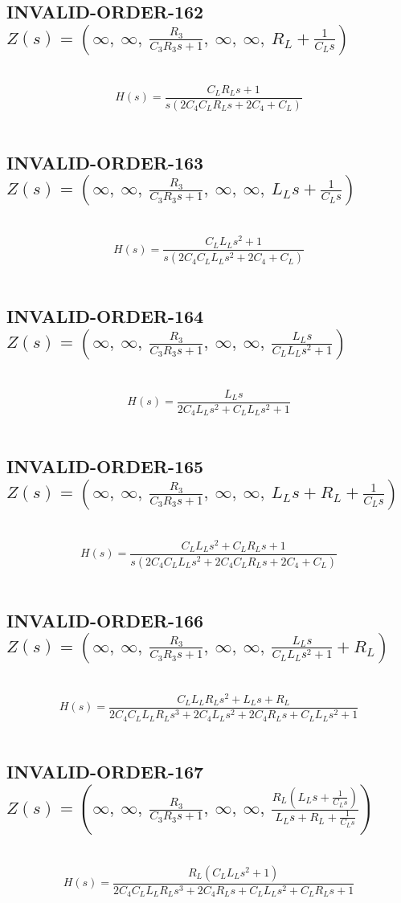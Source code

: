 \documentclass{article}
\begin{document}
\subsection{INVALID-ORDER-162 $Z(s) = \left( \infty, \  \infty, \  \frac{R_{3}}{C_{3} R_{3} s + 1}, \  \infty, \  \infty, \  R_{L} + \frac{1}{C_{L} s}\right)$ } \ 
\textbf{\[H(s) = \frac{C_{L} R_{L} s + 1}{s \left(2 C_{4} C_{L} R_{L} s + 2 C_{4} + C_{L}\right)}\] } \ 
\subsection{INVALID-ORDER-163 $Z(s) = \left( \infty, \  \infty, \  \frac{R_{3}}{C_{3} R_{3} s + 1}, \  \infty, \  \infty, \  L_{L} s + \frac{1}{C_{L} s}\right)$ } \ 
\textbf{\[H(s) = \frac{C_{L} L_{L} s^{2} + 1}{s \left(2 C_{4} C_{L} L_{L} s^{2} + 2 C_{4} + C_{L}\right)}\] } \ 
\subsection{INVALID-ORDER-164 $Z(s) = \left( \infty, \  \infty, \  \frac{R_{3}}{C_{3} R_{3} s + 1}, \  \infty, \  \infty, \  \frac{L_{L} s}{C_{L} L_{L} s^{2} + 1}\right)$ } \ 
\textbf{\[H(s) = \frac{L_{L} s}{2 C_{4} L_{L} s^{2} + C_{L} L_{L} s^{2} + 1}\] } \ 
\subsection{INVALID-ORDER-165 $Z(s) = \left( \infty, \  \infty, \  \frac{R_{3}}{C_{3} R_{3} s + 1}, \  \infty, \  \infty, \  L_{L} s + R_{L} + \frac{1}{C_{L} s}\right)$ } \ 
\textbf{\[H(s) = \frac{C_{L} L_{L} s^{2} + C_{L} R_{L} s + 1}{s \left(2 C_{4} C_{L} L_{L} s^{2} + 2 C_{4} C_{L} R_{L} s + 2 C_{4} + C_{L}\right)}\] } \ 
\subsection{INVALID-ORDER-166 $Z(s) = \left( \infty, \  \infty, \  \frac{R_{3}}{C_{3} R_{3} s + 1}, \  \infty, \  \infty, \  \frac{L_{L} s}{C_{L} L_{L} s^{2} + 1} + R_{L}\right)$ } \ 
\textbf{\[H(s) = \frac{C_{L} L_{L} R_{L} s^{2} + L_{L} s + R_{L}}{2 C_{4} C_{L} L_{L} R_{L} s^{3} + 2 C_{4} L_{L} s^{2} + 2 C_{4} R_{L} s + C_{L} L_{L} s^{2} + 1}\] } \ 
\subsection{INVALID-ORDER-167 $Z(s) = \left( \infty, \  \infty, \  \frac{R_{3}}{C_{3} R_{3} s + 1}, \  \infty, \  \infty, \  \frac{R_{L} \left(L_{L} s + \frac{1}{C_{L} s}\right)}{L_{L} s + R_{L} + \frac{1}{C_{L} s}}\right)$ } \ 
\textbf{\[H(s) = \frac{R_{L} \left(C_{L} L_{L} s^{2} + 1\right)}{2 C_{4} C_{L} L_{L} R_{L} s^{3} + 2 C_{4} R_{L} s + C_{L} L_{L} s^{2} + C_{L} R_{L} s + 1}\] } \ 
\end{document}
